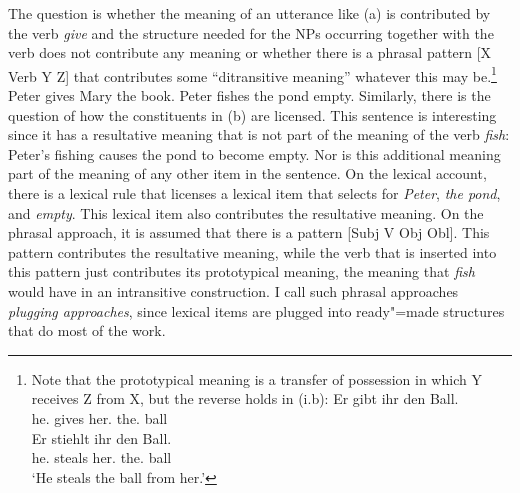 \largerpage
The question is whether the meaning of an utterance like (a) is contributed by the verb
\emph{give} and the structure needed for the NPs occurring together with the verb does not contribute any meaning
or whether there is a phrasal pattern [X Verb Y Z] that contributes some ``ditransitive meaning''
whatever this may be.\footnote{%
Note that the prototypical meaning is a transfer of possession in which Y receives Z from X, but the
reverse holds in (i.b):
\eal
\ex 
\gll Er gibt ihr den Ball.\\
     he.\nom{} gives her.\dat{} the.\acc{} ball\\
\ex
\gll Er stiehlt ihr den Ball.\\
     he.\nom{} steals  her.\dat{} the.\acc{} ball\\
\glt `He steals the ball from her.'
\zllast
}
\eal
\ex Peter gives Mary the book.
\ex Peter fishes the pond empty.
\zl
Similarly, there is the question of how the constituents in (b) are licensed. This sentence is
interesting since it has a resultative meaning that is not part of the meaning of the verb
\emph{fish}: Peter's fishing causes the pond to become empty. Nor is this additional meaning part of
the meaning of any other item in the sentence. On the lexical account,
there is a lexical rule that licenses a lexical item that selects for \emph{Peter}, \emph{the pond},
and \emph{empty}. This lexical item also contributes the resultative meaning. On the phrasal
approach, it is assumed that there is a pattern [Subj V Obj Obl]. This pattern contributes the
resultative meaning, while the verb that is inserted into this pattern just contributes its
prototypical meaning, \eg the meaning that \emph{fish} would have in an
intransitive construction. I call such phrasal approaches \emph{plugging approaches}, since lexical
items are plugged into ready"=made structures that do most of the work.

